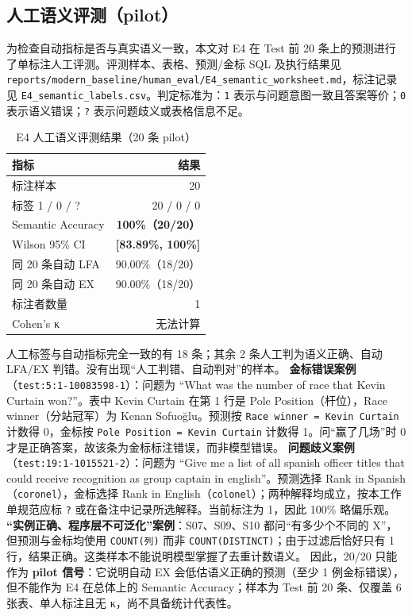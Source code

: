 \documentclass[conference]{IEEEtran}
\begin{document}
\subsection{人工语义评测（pilot）}
为检查自动指标是否与真实语义一致，本文对 E4 在 Test 前 20 条上的预测进行了单标注人工评测。评测样本、表格、预测/金标 SQL 及执行结果见 \texttt{reports/\allowbreak{}modern\_baseline/\allowbreak{}human\_eval/\allowbreak{}E4\_semantic\_worksheet.md}，标注记录见 \texttt{E4\_semantic\_labels.csv}。判定标准为：\texttt{1} 表示与问题意图一致且答案等价；\texttt{0} 表示语义错误；\texttt{?} 表示问题歧义或表格信息不足。
\begin{table}[t]
\centering
\footnotesize
\caption{E4 人工语义评测结果（20 条 pilot）}
\label{tab:t14}
\begin{tabular}{@{}lr@{}}
\toprule
指标 & 结果 \\
\midrule
标注样本 & 20 \\
标签 1 / 0 / ? & 20 / 0 / 0 \\
Semantic Accuracy & \textbf{100\%（20/20）} \\
Wilson 95\% CI & \textbf{[83.89\%, 100\%]} \\
同 20 条自动 LFA & 90.00\%（18/20） \\
同 20 条自动 EX & 90.00\%（18/20） \\
标注者数量 & 1 \\
Cohen's κ & 无法计算 \\
\bottomrule
\end{tabular}
\end{table}
人工标签与自动指标完全一致的有 18 条；其余 2 条人工判为语义正确、自动 LFA/EX 判错。没有出现“人工判错、自动判对”的样本。
\textbf{金标错误案例}（\texttt{test:5:1-10083598-1}）：问题为 “What was the number of race that Kevin Curtain won?”。表中 Kevin Curtain 在第 1 行是 Pole Position（杆位），Race winner（分站冠军）为 Kenan Sofuoğlu。预测按 \texttt{Race winner = Kevin Curtain} 计数得 0，金标按 \texttt{Pole Position = Kevin Curtain} 计数得 1。问“赢了几场”时 0 才是正确答案，故该条为金标标注错误，而非模型错误。
\textbf{问题歧义案例}（\texttt{test:19:1-1015521-2}）：问题为 “Give me a list of all spanish officer titles that could receive recognition as group captain in english”。预测选择 Rank in Spanish（\texttt{coronel}），金标选择 Rank in English（\texttt{colonel}）；两种解释均成立，按本工作单规范应标 \texttt{?} 或在备注中记录所选解释。当前标注为 1，因此 100\% 略偏乐观。
\textbf{“实例正确、程序层不可泛化”案例}：S07、S09、S10 都问“有多少个不同的 X”，但预测与金标均使用 \texttt{COUNT(列)} 而非 \texttt{COUNT(DISTINCT)}；由于过滤后恰好只有 1 行，结果正确。这类样本不能说明模型掌握了去重计数语义。
因此，20/20 只能作为 \textbf{pilot 信号}：它说明自动 EX 会低估语义正确的预测（至少 1 例金标错误），但不能作为 E4 在总体上的 Semantic Accuracy；样本为 Test 前 20 条、仅覆盖 6 张表、单人标注且无 κ，尚不具备统计代表性。
\end{document}
